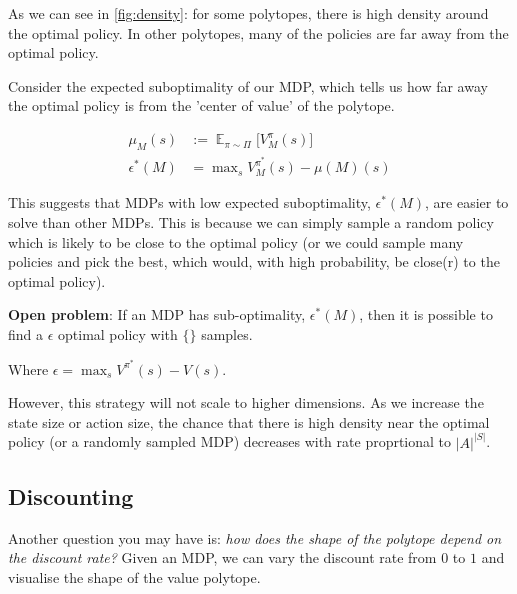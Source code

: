 As we can see in \ref{fig:density}: for some polytopes, there is high density around the optimal policy.
In other polytopes, many of the policies are far away from the optimal policy.

Consider the expected suboptimality of our MDP, which tells us how far away the
optimal policy is from the 'center of value' of the polytope.

\begin{align*}
\mu_M(s) &:= \mathop{\mathbb E}_{\pi\sim\Pi}\Big[V_M^{\pi}(s) \Big]\\
\epsilon^{* }(M) &= \mathop{\text{max}}_s V_M^{\pi^{* }}(s) - \mu(M)(s)
\end{align*}

This suggests that MDPs with low expected suboptimality, $\epsilon^{* }(M)$, are easier to solve than other MDPs.
This is because we can simply sample a random policy which is likely to be close to the optimal policy
(or we could sample many policies and pick the best, which would, with high probability, be close(r) to the optimal policy).

\vspace{5mm}

\textbf{Open problem}\footnotemark: If an MDP has sub-optimality,  $\epsilon^{* }(M)$,
then it is possible to find a $\epsilon$ optimal policy with $\{\}$ samples.


Where $\epsilon = \mathop{\text{max}}_s V^{\pi^{* }}(s) - V(s)$.

\vspace{5mm}

However, this strategy will not scale to higher dimensions.
As we increase the state size or action size, the chance that there is high
density near the optimal policy (or a randomly sampled MDP) decreases with rate proprtional to $|A|^{|S|}$.


\subsection{Discounting}

Another question you may have is: \textit{how does the shape of the polytope depend on the discount rate?}
Given an MDP, we can vary the discount rate from \(0\) to \(1\) and visualise
the shape of the value polytope.

